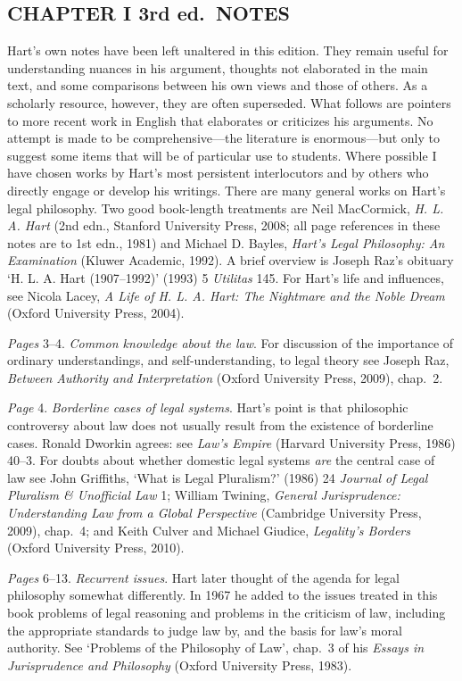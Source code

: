 \subsection{CHAPTER I 3rd ed.~NOTES}\label{chapter-i-3rd-ed.-notes}

Hart's own notes have been left unaltered in this edition. They remain
useful for understanding nuances in his argument, thoughts not
elaborated in the main text, and some comparisons between his own views
and those of others. As a scholarly resource, however, they are often
superseded. What follows are pointers to more recent work in English
that elaborates or criticizes his arguments. No attempt is made to be
comprehensive---the literature is enormous---but only to suggest some
items that will be of particular use to students. Where possible I have
chosen works by Hart's most persistent interlocutors and by others who
directly engage or develop his writings. There are many general works on
Hart's legal philosophy. Two good book-length treatments are Neil
MacCormick, \emph{H. L. A. Hart} (2nd edn., Stanford University Press,
2008; all page references in these notes are to 1st edn., 1981) and
Michael D. Bayles, \emph{Hart's Legal Philosophy: An Examination}
(Kluwer Academic, 1992). A brief overview is Joseph Raz's obituary `H.
L. A. Hart (1907--1992)' (1993) 5 \emph{Utilitas} 145. For Hart's life
and influences, see Nicola Lacey, \emph{A Life of H. L. A. Hart: The
Nightmare and the Noble Dream} (Oxford University Press, 2004).

\emph{Pages} 3--4. \emph{Common knowledge about the law}. For discussion
of the importance of ordinary understandings, and self-understanding, to
legal theory see Joseph Raz, \emph{Between Authority and Interpretation}
(Oxford University Press, 2009), chap.~2.

\emph{Page} 4. \emph{Borderline cases of legal systems}. Hart's point is
that philosophic controversy about law does not usually result from the
existence of borderline cases. Ronald Dworkin agrees: see \emph{Law's
Empire} (Harvard University Press, 1986) 40--3. For doubts about whether
domestic legal systems \emph{are} the central case of law see John
Griffiths, `What is Legal Pluralism?' (1986) 24 \emph{Journal of Legal
Pluralism \& Unofficial Law} 1; William Twining, \emph{General
Jurisprudence: Understanding Law from a Global Perspective} (Cambridge
University Press, 2009), chap.~4; and Keith Culver and Michael Giudice,
\emph{Legality's Borders} (Oxford University Press, 2010).

\emph{Pages} 6--13. \emph{Recurrent issues}. Hart later thought of the
agenda for legal philosophy somewhat differently. In 1967 he added to
the issues treated in this book problems of legal reasoning and problems
in the criticism of law, including the appropriate standards to judge
law by, and the basis for law's moral authority. See `Problems of the
Philosophy of Law', chap.~3 of his \emph{Essays in Jurisprudence and
Philosophy} (Oxford University Press, 1983).

